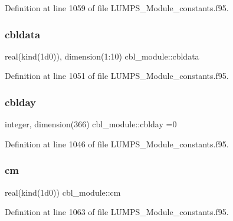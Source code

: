 Definition at line 1059 of file L\+U\+M\+P\+S\+\_\+\+Module\+\_\+constants.\+f95.

\mbox{\label{namespacecbl__module_aae12ee171bb6806332a07b9300284693}} 
\subsubsection{\texorpdfstring{cbldata}{cbldata}}
{\footnotesize\ttfamily real(kind(1d0)), dimension(1\+:10) cbl\+\_\+module\+::cbldata}



Definition at line 1051 of file L\+U\+M\+P\+S\+\_\+\+Module\+\_\+constants.\+f95.

\mbox{\label{namespacecbl__module_a5901bc487fe54be32f04988c42ab7443}} 
\subsubsection{\texorpdfstring{cblday}{cblday}}
{\footnotesize\ttfamily integer, dimension(366) cbl\+\_\+module\+::cblday =0}



Definition at line 1046 of file L\+U\+M\+P\+S\+\_\+\+Module\+\_\+constants.\+f95.

\mbox{\label{namespacecbl__module_ab5d6f31d2f9b523336fb0947a1e53707}} 
\subsubsection{\texorpdfstring{cm}{cm}}
{\footnotesize\ttfamily real(kind(1d0)) cbl\+\_\+module\+::cm}



Definition at line 1063 of file L\+U\+M\+P\+S\+\_\+\+Module\+\_\+constants.\+f95.

\mbox{\label{namespacecbl__module_a1fe4af3f4b8ea35de69189177bcc9d5d}} 
